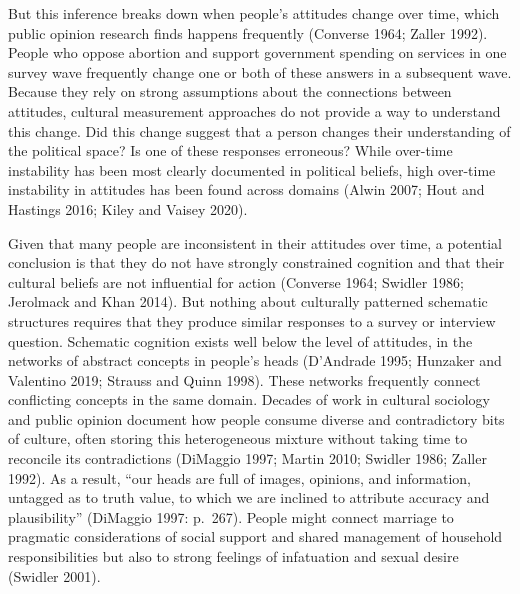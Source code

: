 \documentclass[12pt,]{article}
\begin{document}
But this inference breaks down when people's attitudes change over time, which public opinion research finds happens frequently (Converse 1964; Zaller 1992). People who oppose abortion and support government spending on services in one survey wave frequently change one or both of these answers in a subsequent wave. Because they rely on strong assumptions about the connections between attitudes, cultural measurement approaches do not provide a way to understand this change. Did this change suggest that a person changes their understanding of the political space? Is one of these responses erroneous? While over-time instability has been most clearly documented in political beliefs, high over-time instability in attitudes has been found across domains (Alwin 2007; Hout and Hastings 2016; Kiley and Vaisey 2020).

Given that many people are inconsistent in their attitudes over time, a potential conclusion is that they do not have strongly constrained cognition and that their cultural beliefs are not influential for action (Converse 1964; Swidler 1986; Jerolmack and Khan 2014). But nothing about culturally patterned schematic structures requires that they produce similar responses to a survey or interview question. Schematic cognition exists well below the level of attitudes, in the networks of abstract concepts in people's heads (D'Andrade 1995; Hunzaker and Valentino 2019; Strauss and Quinn 1998). These networks frequently connect conflicting concepts in the same domain. Decades of work in cultural sociology and public opinion document how people consume diverse and contradictory bits of culture, often storing this heterogeneous mixture without taking time to reconcile its contradictions (DiMaggio 1997; Martin 2010; Swidler 1986; Zaller 1992). As a result, ``our heads are full of images, opinions, and information, untagged as to truth value, to which we are inclined to attribute accuracy and plausibility'' (DiMaggio 1997: p.~267). People might connect marriage to pragmatic considerations of social support and shared management of household responsibilities but also to strong feelings of infatuation and sexual desire (Swidler 2001).
\end{document}
